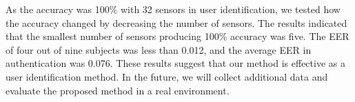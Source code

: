 \documentclass[english,preprint,JIP]{ipsj}
\begin{document}
As the accuracy was 100\% with 32 sensors in user identification, we tested how the accuracy changed by decreasing the number of sensors. The results indicated that the smallest number of sensors producing 100\% accuracy was five. The EER of four out of nine subjects was less than 0.012, and the average EER in authentication was 0.076. These results suggest that our method is effective as a user identification method. In the future, we will collect additional data and evaluate the proposed method in a real environment.







\end{document}
